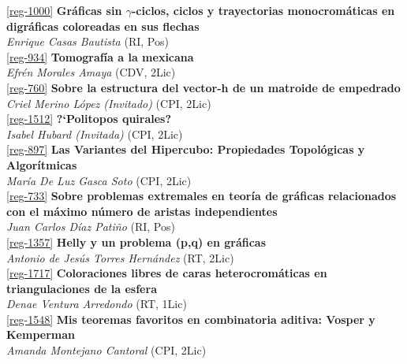 \begin{multicols}{2}
\noindent  \ref{reg-1000}  {\bfseries Gr\'aficas sin $\gamma$-ciclos, ciclos y trayectorias monocrom\'aticas en digr\'aficas coloreadas en sus flechas}\\
{\slshape  Enrique  Casas Bautista} {\footnotesize (RI, Pos)}\\

\noindent  \ref{reg-934}  {\bfseries Tomograf\'ia a la mexicana}\\
{\slshape  Efr\'en  Morales Amaya} {\footnotesize (CDV, 2Lic)}\\

\noindent  \ref{reg-760}  {\bfseries Sobre la estructura del vector-h de un matroide de empedrado}\\
{\slshape  Criel  Merino L\'opez (Invitado)} {\footnotesize (CPI, 2Lic)}\\

\noindent  \ref{reg-1512}  {\bfseries ?`Politopos quirales?}\\
{\slshape  Isabel  Hubard (Invitada)} {\footnotesize (CPI, 2Lic)}\\

\noindent  \ref{reg-897}  {\bfseries Las Variantes del Hipercubo: Propiedades Topol\'ogicas y Algor\'itmicas}\\
{\slshape  Mar\'ia De Luz Gasca Soto} {\footnotesize (CPI, 2Lic)}\\

\noindent  \ref{reg-733}  {\bfseries Sobre problemas extremales en teor\'ia de gr\'aficas relacionados con el m\'aximo n\'umero de aristas independientes}\\
{\slshape  Juan Carlos D\'iaz Pati\~no} {\footnotesize (RI, Pos)}\\

\noindent  \ref{reg-1357}  {\bfseries Helly y un problema (p,q) en gr\'aficas}\\
{\slshape  Antonio de Jes\'us Torres Hern\'andez} {\footnotesize (RT, 2Lic)}\\

\noindent  \ref{reg-1717}  {\bfseries Coloraciones libres de caras heterocrom\'aticas en triangulaciones de la esfera}\\
{\slshape  Denae  Ventura Arredondo} {\footnotesize (RT, 1Lic)}\\

\noindent  \ref{reg-1548}  {\bfseries Mis teoremas favoritos en combinatoria aditiva: Vosper y Kemperman}\\
{\slshape  Amanda  Montejano Cantoral} {\footnotesize (CPI, 2Lic)}\\


\end{multicols}
